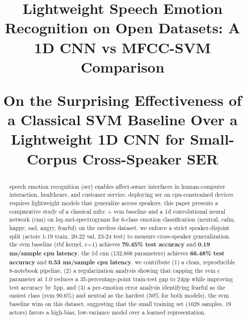 \documentclass[conference]{IEEEtran}
\begin{document}
\title{Lightweight Speech Emotion Recognition on Open Datasets: A 1D CNN vs MFCC-SVM Comparison

\large On the Surprising Effectiveness of a Classical SVM Baseline Over a Lightweight 1D CNN for Small-Corpus Cross-Speaker SER
}

\author{
\and
{}
\and
{}
}

\maketitle
\sloppy
\begin{abstract}

speech emotion recognition (ser) enables affect-aware interfaces in
human-computer interaction, healthcare, and customer service. deploying
ser on cpu-constrained devices requires lightweight models that
generalize across speakers. this paper presents a comparative study of a
classical mfcc + svm baseline and a 1d convolutional neural network
(cnn) on log-mel-spectrograms for 6-class emotion classification
(neutral, calm, happy, sad, angry, fearful) on the ravdess dataset. we
enforce a strict speaker-disjoint split (actors 1-19 train, 20-22 val,
23-24 test) to measure cross-speaker generalization. the svm baseline
(rbf kernel, c=1) achieves \textbf{70.45\% test accuracy} and
\textbf{0.19 ms/sample cpu latency}. the 1d cnn (132,806 parameters)
achieves \textbf{66.48\% test accuracy} and \textbf{0.53 ms/sample cpu
latency}. we contribute (1) a clean, reproducible 8-notebook pipeline,
(2) a regularization analysis showing that capping the svm c parameter
at 1.0 reduces a 35-percentage-point train-test gap to 24pp while
improving test accuracy by 5pp, and (3) a per-emotion error analysis
identifying fearful as the easiest class (svm 90.6\%) and neutral as the
hardest (50\% for both models). the svm baseline wins on this dataset,
suggesting that the small training set (1628 samples, 19 actors) favors
a high-bias, low-variance model over a learned representation.

\end{abstract}
\end{document}
